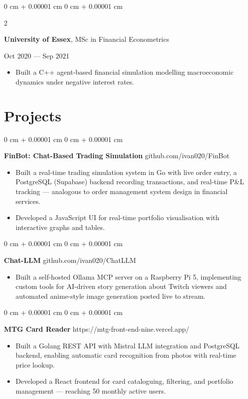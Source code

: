 \documentclass[6pt, letterpaper]{article}
\newenvironment{highlights}{
    \begin{itemize}[
        topsep=0.03 cm,
        parsep=0.03 cm,
        partopsep=0pt,
        itemsep=0pt,
        leftmargin=0 cm + 10pt
    ]
}{
    \end{itemize}
} %
\newenvironment{onecolentry}{
    \begin{adjustwidth}{
        0 cm + 0.00001 cm
    }{
        0 cm + 0.00001 cm
    }
}{
    \end{adjustwidth}
} %
\newenvironment{twocolentry}[2][]{
    \onecolentry
    \def\secondColumn{#2}
    \setcolumnwidth{\fill, 4.5 cm}
    \begin{paracol}{2}
}{
    \switchcolumn \raggedleft \secondColumn
    \end{paracol}
    \endonecolentry
} %
\begin{document}
            \begin{twocolentry}{
                Oct 2020 --- Sep 2021
            }
            \textbf{University of Essex}, MSc in Financial Econometrics
            \end{twocolentry}

            \begin{highlights}
            \item Built a C++ agent-based financial simulation modelling macroeconomic dynamics under negative interest rates.
            \end{highlights}

    \section{Projects}

    \begin{onecolentry}
        \textbf{FinBot: Chat-Based Trading Simulation} \hfill github.com/ivan020/FinBot

        \begin{highlights}
            \item Built a real-time trading simulation system in Go with live order entry, a PostgreSQL (Supabase) backend recording transactions, and real-time P\&L tracking — analogous to order management system design in financial services.
            \item Developed a JavaScript UI for real-time portfolio visualisation with interactive graphs and tables.      
        \end{highlights}
    \end{onecolentry}

    \begin{onecolentry}
        \textbf{Chat-LLM} \hfill github.com/ivan020/ChatLLM

        \begin{highlights}
            \item Built a self-hosted Ollama MCP server on a Raspberry Pi 5, implementing custom tools for AI-driven story generation about Twitch viewers and automated anime-style image generation posted live to stream.
        \end{highlights}
    \end{onecolentry}


    \begin{onecolentry}
        \textbf{MTG Card Reader} \hfill https://mtg-front-end-nine.vercel.app/

        \begin{highlights}
        \item Built a Golang REST API with Mistral LLM integration and PostgreSQL backend, enabling automatic card recognition from photos with real-time price lookup.
        \item Developed a React frontend for card cataloguing, filtering, and portfolio management — reaching 50 monthly active users.      
    \end{highlights}
    \end{onecolentry}
\end{document}
